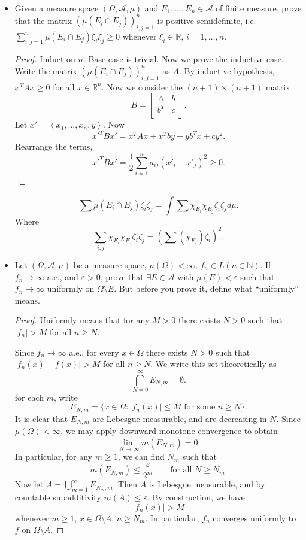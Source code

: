 \begin{itemize}
	\item Given a measure space $(\Omega, \mathcal{A}, \mu)$ and $E_1, \ldots, E_n \in \mathcal{A}$ of finite measure, prove that the matrix $\left( \mu(E_i \cap E_j) \right) _{i, j = 1}^n$ is positive semidefinite, i.e.  $\sum_{i, j=1}^{n} \mu(E_i \cap E_j) \xi_i \xi_j \ge 0$ whenever $\xi_i \in \mathbb{R}$, $i = 1,\ldots, n$.
\begin{proof}
	Induct on $n$. Base case is trivial. Now we prove the inductive case. Write the matrix $\left( \mu(E_i \cap E_j) \right) _{i, j = 1}^n$ as  $A$. By inductive hypothesis, $x^T A x \ge 0$ for all $x \in \mathbb{R}^n$. Now we consider the $(n+1)\times (n+1)$ matrix
	\[
		B = \begin{bmatrix}
			A & b\\
			b^T & c \\
		\end{bmatrix}
	.\] 
	Let $x' = \left\langle x_1, \ldots, x_n, y \right\rangle $. Now
	\[
	x'^T B x' = x^T A x + x^T b y + y b^T x + c y^2
	.\]
Rearrange the terms,
	\[
	x'^T B x' = \frac{1}{2} \sum_{i=1}^{n} a_{ij} (x'_i + x'_j)^2 \ge 0
.\] 
\end{proof}
\begin{correction}
	\[
		\sum \mu\left( E_i \cap E_j \right) \zeta_i \zeta_j = \int \sum \chi_{E_i} \chi_{E_j} \zeta_i \zeta_j d \mu 
	.\] 
	Where
	\[
		\sum_{i, j} \chi_{E_i} \chi_{E_j} \zeta_i \zeta_j = \left( \sum(\chi_{E_i}) \zeta_i \right)^2 
	.\] 
\end{correction}

\item Let $(\Omega, \mathcal{A}, \mu)$ be a measure space, $\mu(\Omega) < \infty $, $f_n \in L(n \in \mathbb{N})$. If $f_n \to  \infty $ a.e., and $\varepsilon>0$, prove that $\exists  E \in \mathcal{A}$ with $\mu(E) < \varepsilon$ such that $f_n \to  \infty $ uniformly on $\Omega\setminus E$. But before you prove it, define what ``uniformly'' means.
\begin{proof}
	Uniformly means that for any $M>0$ there exists $N>0$ such that $\left| f_n \right| > M $ for all $n \ge N$.

	Since $f_n \to \infty $ a.e., for every $x \in \Omega$ there exists $N>0$ such that $\left| f_n(x) - f(x) \right| > M$ for all $n \ge N$. We write this set-theoretically as
	\[
		\bigcap_{N = 0} ^{\infty } E_{N, m} = \emptyset 
	.\] 
	for each $m$, write
	\[
		E_{N, m} = \{x \in \Omega: |f_n(x)| \le M \text{ for some } n \ge N\}
	.\] 
	It is clear that $E_{N, m}$ are Lebesgue measurable, and are decreasing in $N$. Since $\mu(\Omega) <\infty $, we may apply downward monotone convergence to obtain
	\[
		\lim_{N \to \infty} m\left( E_{N, m} \right)  = 0
	.\] 
	In particular, for any $m \ge 1$, we can find $N_m$ such that
	\[
		m\left( E_{N, m} \right) \le \frac{\varepsilon}{2^m}\qquad \text{for all }N \ge N_m
	.\] 
	Now let $A = \bigcup_{m = 1} ^\infty E_{N_m, m}$. Then $A$ is Lebesgue measurable, and by countable subadditivity $m(A) \le \varepsilon$. By construction, we have
	\[
		\left| f_n(x) \right| > M
	\] 
	whenever $m \ge 1$, $x \in \Omega \setminus A$, $n \ge N_m$. In particular, $f_n$ converges uniformly to $f$ on $\Omega\setminus A$.
\end{proof}


\end{itemize}
